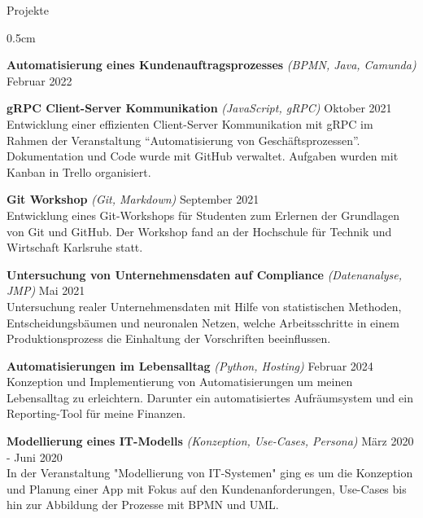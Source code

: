 \documentclass{resume} %
\begin{document}
\begin{rSection}{Projekte}
\begin{adjustwidth}{0.5cm}{}
        \item \textbf{Automatisierung eines Kundenauftragsprozesses} \textit{(BPMN, Java, Camunda)} \hfill {Februar 2022} \\
    
        \item \textbf{gRPC Client-Server Kommunikation} \textit{(JavaScript, gRPC)} \hfill {Oktober 2021} \\
        {Entwicklung einer effizienten Client-Server Kommunikation mit gRPC im Rahmen der Veranstaltung “Automatisierung von Geschäftsprozessen”.
        Dokumentation und Code wurde mit GitHub verwaltet. Aufgaben wurden mit Kanban in Trello organisiert.}
        
        \item \textbf{Git Workshop} \textit{(Git, Markdown)} \hfill {September 2021} \\
        {Entwicklung eines Git-Workshops für Studenten zum Erlernen der Grundlagen von Git und GitHub.
        Der Workshop fand an der Hochschule für Technik und Wirtschaft Karlsruhe statt.}
    
        \item \textbf{Untersuchung von Unternehmensdaten auf Compliance} \textit{(Datenanalyse, JMP)} \hfill {Mai 2021} \\
        {Untersuchung realer Unternehmensdaten mit Hilfe von statistischen Methoden, Entscheidungsbäumen und neuronalen Netzen,
        welche Arbeitsschritte in einem Produktionsprozess die Einhaltung der Vorschriften beeinflussen.}
    
        \item \textbf{Automatisierungen im Lebensalltag} \textit{(Python, Hosting)}  \hfill {Februar 2024} \\
        {Konzeption und Implementierung von Automatisierungen um meinen Lebensalltag zu erleichtern. Darunter ein automatisiertes Aufräumsystem und ein Reporting-Tool für meine Finanzen.} 
        
        \item \textbf{Modellierung eines IT-Modells} \textit{(Konzeption, Use-Cases, Persona)} \hfill {März 2020 - Juni 2020} \\
        {In der Veranstaltung "Modellierung von IT-Systemen" ging es um die Konzeption und Planung einer App mit Fokus auf den Kundenanforderungen, Use-Cases bis hin zur Abbildung der Prozesse mit BPMN und UML.}
    
    \end{adjustwidth}
    
\end{rSection}
\end{document}
